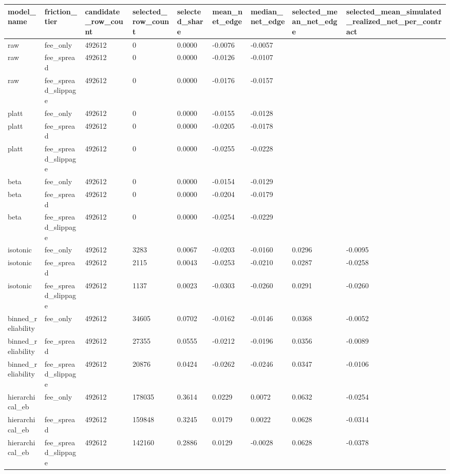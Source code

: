 \begin{tabular}{lllllllll}
\toprule
model\_name & friction\_tier & candidate\_row\_count & selected\_row\_count & selected\_share & mean\_net\_edge & median\_net\_edge & selected\_mean\_net\_edge & selected\_mean\_simulated\_realized\_net\_per\_contract \\
\midrule
raw & fee\_only & 492612 & 0 & 0.0000 & -0.0076 & -0.0057 &  &  \\
raw & fee\_spread & 492612 & 0 & 0.0000 & -0.0126 & -0.0107 &  &  \\
raw & fee\_spread\_slippage & 492612 & 0 & 0.0000 & -0.0176 & -0.0157 &  &  \\
platt & fee\_only & 492612 & 0 & 0.0000 & -0.0155 & -0.0128 &  &  \\
platt & fee\_spread & 492612 & 0 & 0.0000 & -0.0205 & -0.0178 &  &  \\
platt & fee\_spread\_slippage & 492612 & 0 & 0.0000 & -0.0255 & -0.0228 &  &  \\
beta & fee\_only & 492612 & 0 & 0.0000 & -0.0154 & -0.0129 &  &  \\
beta & fee\_spread & 492612 & 0 & 0.0000 & -0.0204 & -0.0179 &  &  \\
beta & fee\_spread\_slippage & 492612 & 0 & 0.0000 & -0.0254 & -0.0229 &  &  \\
isotonic & fee\_only & 492612 & 3283 & 0.0067 & -0.0203 & -0.0160 & 0.0296 & -0.0095 \\
isotonic & fee\_spread & 492612 & 2115 & 0.0043 & -0.0253 & -0.0210 & 0.0287 & -0.0258 \\
isotonic & fee\_spread\_slippage & 492612 & 1137 & 0.0023 & -0.0303 & -0.0260 & 0.0291 & -0.0260 \\
binned\_reliability & fee\_only & 492612 & 34605 & 0.0702 & -0.0162 & -0.0146 & 0.0368 & -0.0052 \\
binned\_reliability & fee\_spread & 492612 & 27355 & 0.0555 & -0.0212 & -0.0196 & 0.0356 & -0.0089 \\
binned\_reliability & fee\_spread\_slippage & 492612 & 20876 & 0.0424 & -0.0262 & -0.0246 & 0.0347 & -0.0106 \\
hierarchical\_eb & fee\_only & 492612 & 178035 & 0.3614 & 0.0229 & 0.0072 & 0.0632 & -0.0254 \\
hierarchical\_eb & fee\_spread & 492612 & 159848 & 0.3245 & 0.0179 & 0.0022 & 0.0628 & -0.0314 \\
hierarchical\_eb & fee\_spread\_slippage & 492612 & 142160 & 0.2886 & 0.0129 & -0.0028 & 0.0628 & -0.0378 \\
\bottomrule
\end{tabular}
